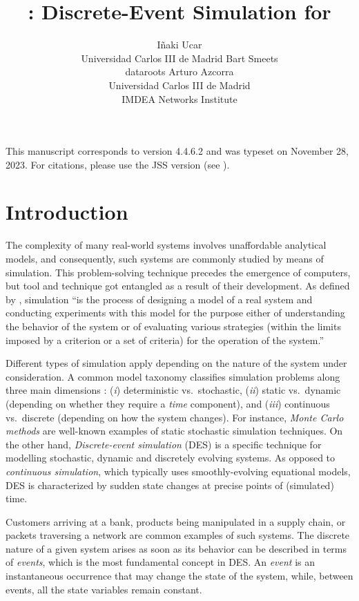 \documentclass[
  nojss]{jss}
\author{
Iñaki Ucar\\Universidad Carlos III de Madrid \And Bart
Smeets\\dataroots \And Arturo Azcorra\\Universidad Carlos III de
Madrid\\
IMDEA Networks Institute
}
\title{\pkg{simmer}: Discrete-Event Simulation for \proglang{R}}
\begin{document}
\setlength{\abovedisplayskip}{0pt}

This manuscript corresponds to  version 4.4.6.2 and was
typeset on November 28, 2023. For citations, please use the JSS version
(see ).

\hypertarget{introduction}{%
\section{Introduction}\label{introduction}}

The complexity of many real-world systems involves unaffordable
analytical models, and consequently, such systems are commonly studied
by means of simulation. This problem-solving technique precedes the
emergence of computers, but tool and technique got entangled as a result
of their development. As defined by \citet{Shannon:1975:Systems},
simulation ``is the process of designing a model of a real system and
conducting experiments with this model for the purpose either of
understanding the behavior of the system or of evaluating various
strategies (within the limits imposed by a criterion or a set of
criteria) for the operation of the system.''

Different types of simulation apply depending on the nature of the
system under consideration. A common model taxonomy classifies
simulation problems along three main dimensions
\citep{Law:2000:Simulation}: (\emph{i}) deterministic vs.~stochastic,
(\emph{ii}) static vs.~dynamic (depending on whether they require a
\emph{time} component), and (\emph{iii}) continuous vs.~discrete
(depending on how the system changes). For instance, \emph{Monte Carlo
methods} are well-known examples of static stochastic simulation
techniques. On the other hand, \emph{Discrete-event simulation} (DES) is
a specific technique for modelling stochastic, dynamic and discretely
evolving systems. As opposed to \emph{continuous simulation}, which
typically uses smoothly-evolving equational models, DES is characterized
by sudden state changes at precise points of (simulated) time.

Customers arriving at a bank, products being manipulated in a supply
chain, or packets traversing a network are common examples of such
systems. The discrete nature of a given system arises as soon as its
behavior can be described in terms of \emph{events}, which is the most
fundamental concept in DES. An \emph{event} is an instantaneous
occurrence that may change the state of the system, while, between
events, all the state variables remain constant.
\end{document}
